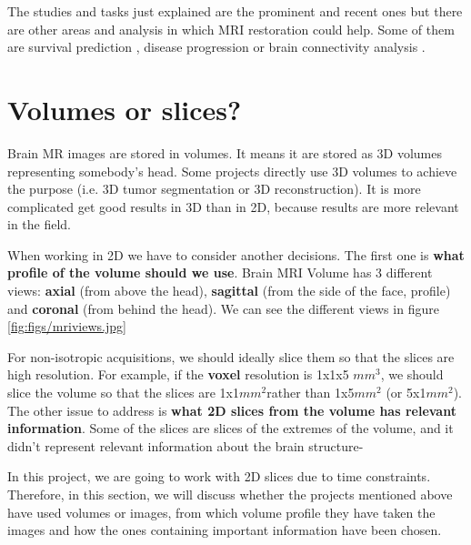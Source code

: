 The studies and tasks just explained are the prominent and recent ones but there are other areas and analysis in which MRI restoration could help. Some of them are survival prediction \cite{AnexoReviewAditional}, disease progression \cite{AnexoProgression} or brain connectivity analysis   \cite{AnexoConnectivity}.

\section{Volumes or slices?}

Brain MR images are stored in volumes. It means it are stored as 3D volumes representing somebody's head. Some projects directly use 3D volumes to achieve the purpose (i.e. 3D tumor segmentation or 3D reconstruction). It is more complicated get good results in 3D than in 2D, because results are more relevant in the field. 

When working in 2D we have to consider another decisions. The first one is \textbf{what profile of the volume should we use}. Brain MRI Volume has 3 different views: \textbf{axial} (from above the head), \textbf{sagittal} (from the side of the face, profile) and \textbf{coronal} (from behind the head). We can see the different views in figure \ref{fig:figs/mriviews.jpg}


For non-isotropic acquisitions, we should ideally slice them so that the slices are high resolution. For example, if the \textbf{voxel} resolution is 1x1x5 $mm^3$, we should slice the volume so that the slices are 1x1$mm^2$rather than 1x5$mm^2$ (or 5x1$mm^2$). The other issue to address is \textbf{what 2D slices from the volume has relevant information}. Some of the slices are slices of the extremes of the volume, and it didn't represent relevant information about the brain structure-

In this project, we are going to work with 2D slices due to time constraints. Therefore, in this section, we will discuss whether the projects mentioned above have used volumes or images, from which volume profile they have taken the images and how the ones containing important information have been chosen. 

